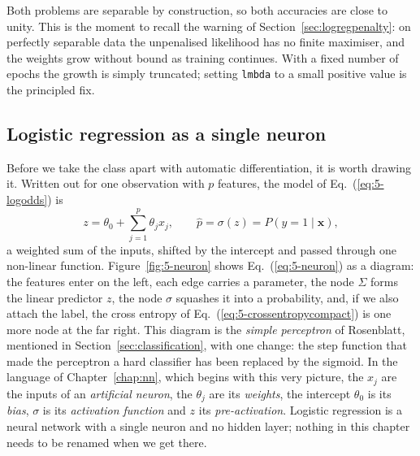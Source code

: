 Both problems are separable by construction, so both accuracies are close to
unity.  This is the moment to recall the warning of
Section~\ref{sec:logregpenalty}: on perfectly separable data the unpenalised
likelihood has no finite maximiser, and the weights grow without bound as
training continues.  With a fixed number of epochs the growth is simply
truncated; setting \texttt{lmbda} to a small positive value is the principled
fix.

\subsection{Logistic regression as a single neuron}
\label{sec:logregneuron}

Before we take the class apart with automatic differentiation, it is worth
drawing it.  Written out for one observation with $p$ features, the model
of Eq.~(\ref{eq:5-logodds}) is
\begin{equation}
  z = \theta_0 + \sum_{j=1}^{p}\theta_j x_j ,
  \qquad
  \hat p = \sigma(z) = P(y=1\mid\bm{x}) ,
  \label{eq:5-neuron}
\end{equation}
a weighted sum of the inputs, shifted by the intercept and passed through
one non-linear function.  Figure~\ref{fig:5-neuron} shows
Eq.~(\ref{eq:5-neuron}) as a diagram: the features enter on the left, each
edge carries a parameter, the node $\Sigma$ forms the linear predictor $z$,
the node $\sigma$ squashes it into a probability, and, if we also attach
the label, the cross entropy of Eq.~(\ref{eq:5-crossentropycompact}) is one
more node at the far right.  This diagram is the \emph{simple perceptron}
of Rosenblatt, mentioned in Section~\ref{sec:classification}, with one
change: the step function that made the perceptron a hard classifier has
been replaced by the sigmoid.  In the language of Chapter~\ref{chap:nn},
which begins with this very picture, the $x_j$ are the inputs of an
\emph{artificial neuron}, the $\theta_j$ are its \emph{weights}, the
intercept $\theta_0$ is its \emph{bias}, $\sigma$ is its \emph{activation
function} and $z$ its \emph{pre-activation}.  Logistic regression is a
neural network with a single neuron and no hidden layer; nothing in this
chapter needs to be renamed when we get there.

